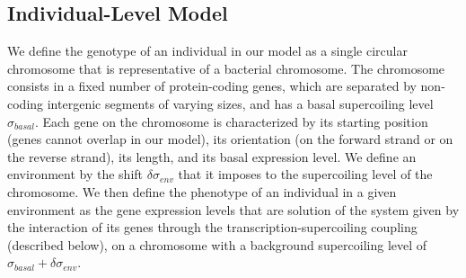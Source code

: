 \subsection{Individual-Level Model}
\label{sec:ploscb:indiv_model}

We define the genotype of an individual in our model as a single circular chromosome that is representative of a bacterial chromosome.
The chromosome consists in a fixed number of protein-coding genes, which are separated by non-coding intergenic segments of varying sizes, and has a basal supercoiling level $\sigma_{basal}$.
Each gene on the chromosome is characterized by its starting position (genes cannot overlap in our model), its orientation (on the forward strand or on the reverse strand), its length, and its basal expression level.
We define an environment by the shift $\delta\sigma_{env}$ that it imposes to the supercoiling level of the chromosome.
We then define the phenotype of an individual in a given environment as the gene expression levels that are solution of the system given by the interaction of its genes through the transcription-supercoiling coupling (described below), on a chromosome with a background supercoiling level of $\sigma_{basal} + \delta\sigma_{env}$.

